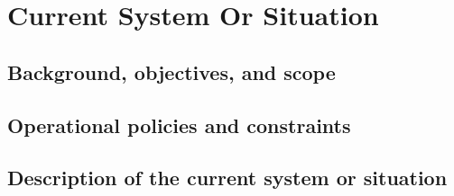 \chapter{Current System Or Situation \\
\label{Chapter::Current System Or Situation}}


\section{Background, objectives, and scope \label{Section::Background,objectives and scope} }


\section { Operational policies and constraints \label{Section::Operational Policies and constraints}}



\section{Description of the current system or situation \label{Section::Description of the current system or situation}}



